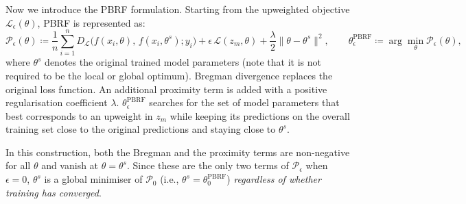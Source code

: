 Now we introduce the PBRF formulation. Starting from the upweighted objective $\mathcal{L}_{\epsilon}(\theta)$, PBRF is represented as:
\[
\mathcal{P}_{\epsilon}(\theta)
\coloneqq
\frac{1}{n}
\sum_{i=1}^{n}
D_{\mathcal{L}}\big(f(x_i, \theta),\, f(x_i, \theta^s); y_i\big)
+
\epsilon\, \mathcal{L}(z_m, \theta)
+
\frac{\lambda}{2}\|\theta - \theta^s\|^2,
\qquad
\theta^{\mathrm{PBRF}}_{\epsilon}
\coloneqq
\arg\min_\theta
\mathcal{P}_{\epsilon}(\theta),
\]
where $\theta^s$ denotes the original trained model parameters (note that it is not required to be the local or global optimum). Bregman divergence replaces the original loss function. An additional proximity term is added with a positive regularisation coefficient $\lambda$. $\theta^{\mathrm{PBRF}}_{\epsilon}$ searches for the set of model parameters that best corresponds to an upweight in $z_m$ while keeping its predictions on the overall training set close to the original predictions and staying close to $\theta^s$.

In this construction, both the Bregman and the proximity terms are non-negative for all $\theta$ and vanish at $\theta = \theta^s$. Since these are the only two terms of $\mathcal{P}_{\epsilon}$ when $\epsilon = 0$, $\theta^s$ is a global minimiser of $\mathcal{P}_0$ (i.e., $\theta^s = \theta^{\mathrm{PBRF}}_0$) \emph{regardless of whether training has converged}.


